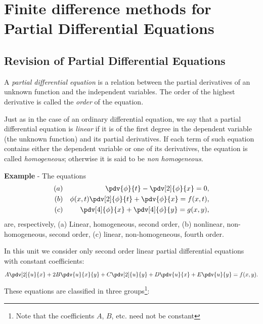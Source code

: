 
\chapter[Partial Differential Equations]{Finite difference methods for Partial Differential Equations}

\section[Revision]{Revision of Partial Differential Equations}

A {\em partial differential equation} is a relation between the
partial derivatives of an unknown function and the independent
variables.  The order of the highest derivative is called the {\em
  order} of the equation.

Just as in the case of an ordinary differential equation, we say that
a partial differential equation is {\em linear} if it is of the first
degree in the dependent variable (the unknown function) and its
partial derivatives.  If each term of such equation contains either
the dependent variable or one of its derivatives, the equation is
called {\em homogeneous}; otherwise it is said to be {\em non
  homogeneous}.

\smallskip

\noindent
{\bf Example} - The equations
%
\begin{eqnarray*}
  (a) & & \pdv{\phi}{t} - \pdv[2]{\phi}{x} = 0, \\
  (b) & & \phi(x,t) \pdv[2]{\phi}{t} + \pdv{\phi}{x} = f(x,t), \\
  (c) & & \pdv[4]{\phi}{x} + \pdv[4]{\phi}{y} = g(x,y) ,
\end{eqnarray*}
%
are, respectively, (a) Linear, homogeneous, second order, (b)
nonlinear, non-homogeneous, second order, (c) linear, non-homogeneous,
fourth order.

\smallskip

In this unit we consider only second order linear partial differential
equations with constant coefficients:
%
\begin{equation*}
  A \pdv[2]{u}{x} + 2 B \pdv{u}{x}{y} +
  C \pdv[2]{u}{y} + D \pdv{u}{x} + E \pdv{u}{y} = f(x,y) .
\end{equation*}
%
These equations are classified in three groups\footnote{Note that the
  coefficients $A$, $B$, etc. need not be constant}:

\medskip

